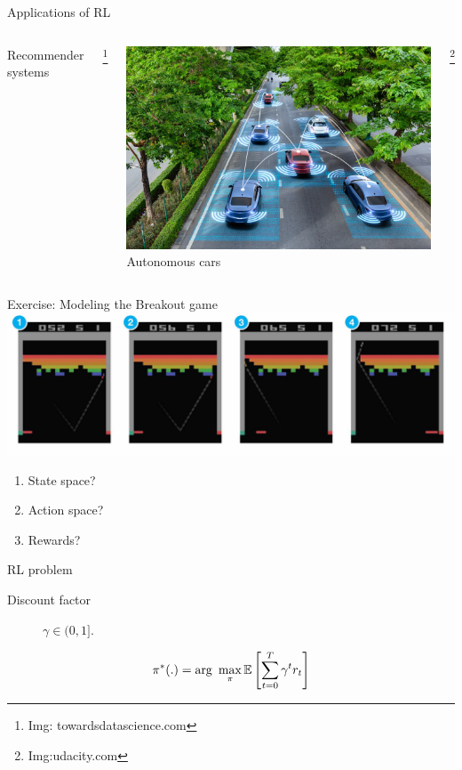 \documentclass[notes]{beamer} %
\begin{document}
\begin{frame}{Applications of RL}
\begin{columns}
\begin{minipage}{\linewidth}
    Recommender systems
    \end{minipage}\footnote{Img: towardsdatascience.com}
    \pause
    \begin{minipage}{\linewidth}
      \includegraphics[width=0.7\linewidth]{./media/autonomous-cars.jpeg}\\
      Autonomous cars
    \end{minipage}\footnote{Img:udacity.com}
  \end{columns}
\end{frame}

\begin{frame}{Exercise: Modeling the Breakout game}
  \centering
  \includegraphics[width=0.6\linewidth]{./media/DQN-breakout.png}
  \begin{enumerate}
  \item State space? 
  \item Action space? 
  \item Rewards?
  \end{enumerate}
\end{frame}


\begin{frame}{RL problem}
  \begin{description}
  \item[Discount factor ] $\gamma \in (0,1]$.
  \end{description}
  \begin{align*}
    \pi^*(.) = \arg~\max_{\pi} \mathbb{E}\left[\sum_{t=0}^{T}
      \gamma^{t} r_t \right]
  \end{align*}
\end{frame}
\end{document}

